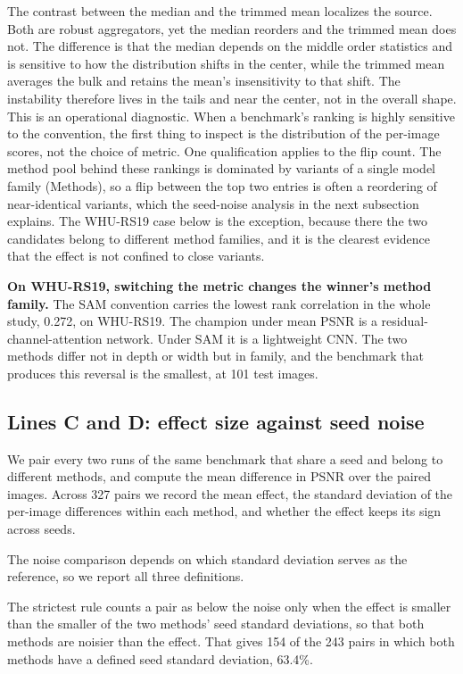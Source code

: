 \documentclass[pdflatex,sn-nature]{sn-jnl}
\begin{document}
The contrast between the median and the trimmed mean localizes the source. Both are robust aggregators, yet the median reorders and the trimmed mean does not. The difference is that the median depends on the middle order statistics and is sensitive to how the distribution shifts in the center, while the trimmed mean averages the bulk and retains the mean's insensitivity to that shift. The instability therefore lives in the tails and near the center, not in the overall shape. This is an operational diagnostic. When a benchmark's ranking is highly sensitive to the convention, the first thing to inspect is the distribution of the per-image scores, not the choice of metric. One qualification applies to the flip count. The method pool behind these rankings is dominated by variants of a single model family (Methods), so a flip between the top two entries is often a reordering of near-identical variants, which the seed-noise analysis in the next subsection explains. The WHU-RS19 case below is the exception, because there the two candidates belong to different method families, and it is the clearest evidence that the effect is not confined to close variants.

\textbf{On WHU-RS19, switching the metric changes the winner's method family.} The SAM convention carries the lowest rank correlation in the whole study, 0.272, on WHU-RS19. The champion under mean PSNR is a residual-channel-attention network. Under SAM it is a lightweight CNN. The two methods differ not in depth or width but in family, and the benchmark that produces this reversal is the smallest, at 101 test images.

\subsection{Lines C and D: effect size against seed noise}\label{sec:noise}

We pair every two runs of the same benchmark that share a seed and belong to different methods, and compute the mean difference in PSNR over the paired images. Across 327 pairs we record the mean effect, the standard deviation of the per-image differences within each method, and whether the effect keeps its sign across seeds.

The noise comparison depends on which standard deviation serves as the reference, so we report all three definitions.

The strictest rule counts a pair as below the noise only when the effect is smaller than the smaller of the two methods' seed standard deviations, so that both methods are noisier than the effect. That gives 154 of the 243 pairs in which both methods have a defined seed standard deviation, 63.4\%.
\end{document}
